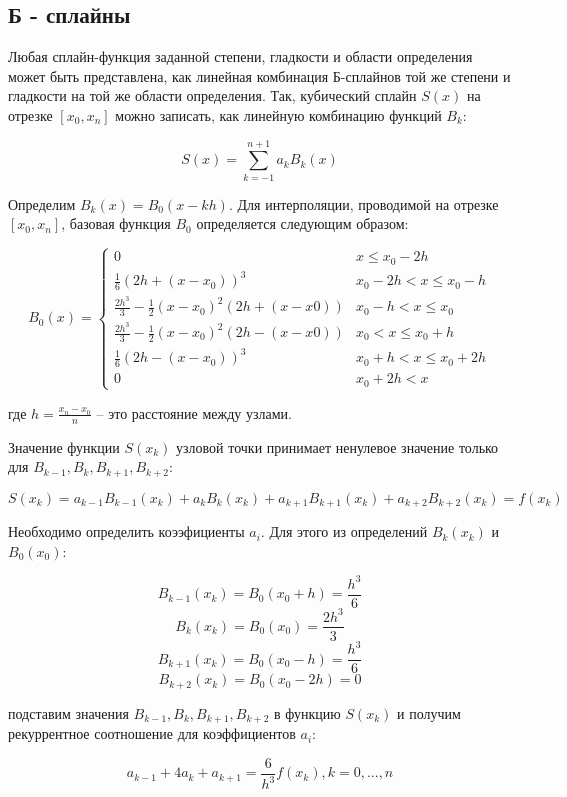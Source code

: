\documentclass[12pt]{article}
\begin{document}
    
   	{
    		\subsection{Б - сплайны}
   	}
    
	Любая сплайн-функция заданной степени, гладкости и области определения может быть представлена, как линейная комбинация Б-сплайнов той же степени и гладкости на той же области определения. Так, кубический сплайн $S(x)$ на отрезке $[x_0, x_n]$ можно записать, как линейную комбинацию функций $B_k$:
	
		$$S(x)=\sum\limits_{k=-1}^{n+1} a_k B_k(x)$$
	
	Определим $B_k(x)=B_0(x-kh)$. Для интерполяции, проводимой на отрезке $[x_0, x_n]$, базовая функция $B_0$ определяется следующим образом:
	
	$$B_0(x)=
		\begin{cases}
			0 											& x \leq x_0-2h \\
			\frac{1}{6}(2h+(x-x_0))^3 						& x_0-2h < x \leq x_0-h \\
			\frac{2h^3}{3} - \frac{1}{2}(x-x_0)^2(2h+(x-x0))	 	& x_0-h < x \leq x_0 \\
			\frac{2h^3}{3} - \frac{1}{2}(x-x_0)^2(2h-(x-x0))	 	& x_0 < x \leq x_0 + h \\
			\frac{1}{6}(2h-(x-x_0))^3 						& x_0+h < x \leq x_0 + 2h\\
    			0											& x_0 + 2h < x 
		\end{cases}
	$$
	
	где $h=\frac{x_n-x_0}{n}$ -- это расстояние между узлами.
	
	Значение функции $S(x_k)$ узловой точки принимает ненулевое значение только для $B_{k-1}, B_k, B_{k+1}, B_{k+2}$:
	
		$$S(x_k)=a_{k-1}B_{k-1}(x_k) + a_k B_k (x_k) + a_{k+1}B_{k+1}(x_k) + a_{k+2}B_{k+2}(x_k) =f(x_k)$$
	
	Необходимо определить коээфициенты $a_i$. Для этого из определений $B_k(x_k)$ и $B_0(x_0)$:
	
		$$B_{k-1}(x_k)=B_0(x_0+h)=\frac{h^3}{6}$$
		$$B_k(x_k)=B_0(x_0)=\frac{2h^3}{3}$$
		$$B_{k+1}(x_k)=B_0(x_0-h)=\frac{h^3}{6}$$
		$$B_{k+2}(x_k)=B_0(x_0-2h)=0$$
		
	подставим значения $B_{k-1}, B_k, B_{k+1}, B_{k+2}$ в функцию $S(x_k)$ и получим рекуррентное соотношение для коэффициентов $a_i$:
	
		$$a_{k-1}+4a_k+a_{k+1}=\frac{6}{h^3}f(x_k), k = 0,...,n$$
		
\end{document}
